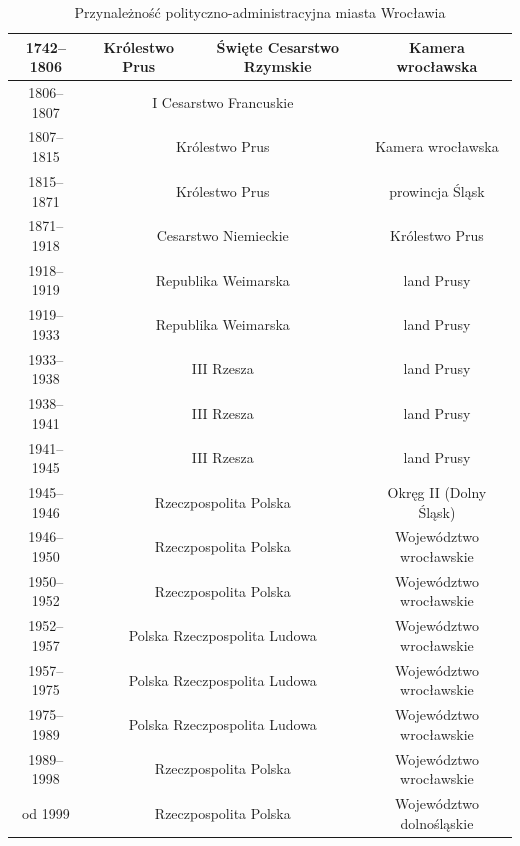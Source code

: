 \documentclass{article}
\begin{document}
\begin{table}[h!]
\begin{adjustwidth}{-1.2in}{-.5in}
\begin{tabular}{|c|c|c|c|}
    \hline
        1742–1806 & Królestwo Prus & Święte Cesarstwo Rzymskie & Kamera wrocławska \\
    \hline
        1806–1807 & \multicolumn{2}{c|}{I Cesarstwo Francuskie} & \\
    \hline
        1807–1815 & \multicolumn{2}{c|}{Królestwo Prus} & Kamera wrocławska \\
    \hline
        1815–1871 & \multicolumn{2}{c|}{Królestwo Prus} & prowincja Śląsk \\
    \hline
        1871–1918 & \multicolumn{2}{c|}{Cesarstwo Niemieckie} & Królestwo Prus \\
    \hline
        1918–1919 & \multicolumn{2}{c|}{Republika Weimarska} & land Prusy \\
    \hline
        1919–1933 & \multicolumn{2}{c|}{Republika Weimarska} & land Prusy \\
    \hline
        1933–1938 & \multicolumn{2}{c|}{III Rzesza} & land Prusy \\
    \hline
        1938–1941 & \multicolumn{2}{c|}{III Rzesza} & land Prusy \\
    \hline
        1941–1945 & \multicolumn{2}{c|}{III Rzesza} & land Prusy \\
    \hline
        1945–1946 & \multicolumn{2}{c|}{Rzeczpospolita Polska} & Okręg II (Dolny Śląsk) \\
    \hline
        1946–1950 & \multicolumn{2}{c|}{Rzeczpospolita Polska} & Województwo wrocławskie \\
    \hline
        1950–1952 & \multicolumn{2}{c|}{Rzeczpospolita Polska} & Województwo wrocławskie \\
    \hline
            1952–1957 & \multicolumn{2}{c|}{Polska Rzeczpospolita Ludowa} & Województwo wrocławskie \\
    \hline
           1957–1975 & \multicolumn{2}{c|}{Polska Rzeczpospolita Ludowa} &  Województwo wrocławskie \\
    \hline
            1975–1989 & \multicolumn{2}{c|}{Polska Rzeczpospolita Ludowa} & Województwo wrocławskie \\
    \hline
            1989–1998 & \multicolumn{2}{c|}{Rzeczpospolita Polska} & Województwo wrocławskie \\
    \hline
            od 1999 & \multicolumn{2}{c|}{Rzeczpospolita Polska} & Województwo dolnośląskie \\
    \hline
    \end{tabular}
    \caption{Przynależność polityczno-administracyjna miasta Wrocławia}
    \label{tab:tabela2}
    \end{adjustwidth}
\end{table}
\newpage
\end{document}
